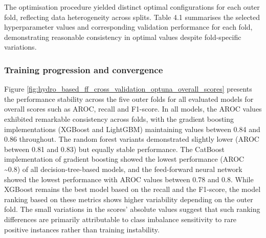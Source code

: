 The optimisation procedure yielded distinct optimal configurations for each outer fold, reflecting data heterogeneity across splits. Table 4.1 summarises the selected hyperparameter values and corresponding validation performance for each fold, demonstrating reasonable consistency in optimal values despite fold-specific variations.


\subsubsection{Training progression and convergence}

Figure \ref{fig:hydro_based_ff_cross_validation_optuna_overall_scores} presents the performance stability across the five outer folds for all evaluated models for overall scores such as AROC, recall and F1-score. In all models, the AROC values exhibited remarkable consistency across folds, with the gradient boosting implementations (XGBoost and LightGBM) maintaining values between 0.84 and 0.86 throughout. The random forest variants demonstrated slightly lower (AROC between 0.81 and 0.83) but equally stable performance. The CatBoost implementation of gradient boosting showed the lowest performance (AROC \sim0.8) of all decision-tree-based models, and the feed-forward neural network showed the lowest performance with AROC values between 0.78 and 0.8. While XGBoost remains the best model based on the recall and the F1-score, the model ranking based on these metrics shows higher variability depending on the outer fold. The small variations in the scores' absolute values suggest that such ranking differences are primarily attributable to class imbalance sensitivity to rare positive instances rather than training instability. 

